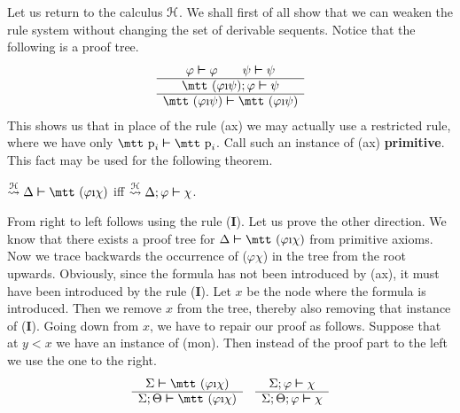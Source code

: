 Let us return to the calculus $\mathcal{H}$. We shall first of all show
that we can weaken the rule system without changing the set of
derivable sequents. Notice that the following is a proof tree.
\begin{equation}
\begin{array}{c}
\varphi \bvdash \varphi \qquad \psi \bvdash \psi \\\hline
\mbox{\mtt ($\varphi$\symbol{25}$\psi$)};\varphi \bvdash \psi \\\hline
\mbox{\mtt ($\varphi$\symbol{25}$\psi$)}
    \bvdash\mbox{\mtt ($\varphi$\symbol{25}$\psi$)}
\end{array}
\end{equation}
This shows us that in place of the rule (ax) we may actually use a
restricted rule, where we have only $\mbox{\mtt p}_i \bvdash %
\mbox{\mtt p}_i$.
Call such an instance of (ax) \textbf{primitive}. This fact may be
used for the following theorem.
\begin{lem}
$\stackrel{\CH}{\rightsquigarrow} \Delta \bvdash 
\mbox{\mtt ($\varphi$\symbol{25}$\chi$)}$ iff 
$\stackrel{\mathcal{H}}{\rightsquigarrow} \Delta;\varphi \boldsymbol{\vdash}\chi$.
\end{lem}
\proofbeg
From right to left follows using the rule (\textbf{I}{\mtt{}}).
Let us prove the other direction. We know that there exists a proof
tree for $\Delta \bvdash \mbox{\mtt ($\varphi$\symbol{25}$\chi$)}$
from primitive axioms. Now we trace backwards the occurrence of
{\mtt ($\varphi$$\chi$)} in the tree from the root
upwards. Obviously, since the formula has not been introduced
by (ax), it must have been introduced by the rule 
(\textbf{I}{\mtt{}}). Let $x$ be the node where the 
formula is introduced. Then we remove $x$ from the tree, thereby 
also removing that instance of (\textbf{I}{\mtt{}}). 
Going down from $x$, we have to repair our proof as follows. 
Suppose that at $y < x$ we have an instance of
(mon). Then instead of the proof part to the left we use the one
to the right.
\begin{equation}
\begin{array}{c}
    \Sigma\bvdash\mbox{\mtt ($\varphi$\symbol{25}$\chi$)} \\\hline
    \Sigma;\Theta\bvdash\mbox{\mtt ($\varphi$\symbol{25}$\chi$)}
\end{array}
\quad
\begin{array}{c}
    \Sigma;\varphi\bvdash\chi \\\hline
    \Sigma;\Theta;\varphi\bvdash\chi
\end{array}
\end{equation}
